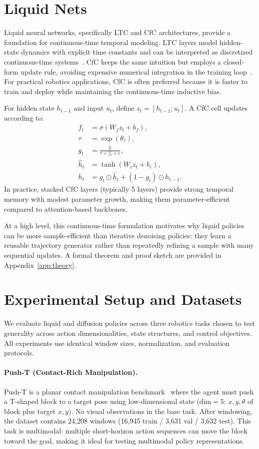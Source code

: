 \documentclass{article}
\begin{document}
\section{Liquid Nets}
Liquid neural networks, specifically LTC and CfC architectures, provide a foundation for continuous-time temporal modeling. LTC layers model hidden-state dynamics with explicit time constants and can be interpreted as discretized continuous-time systems~\cite{hasani2021ltc}. CfC keeps the same intuition but employs a closed-form update rule, avoiding expensive numerical integration in the training loop~\cite{hasani2022cfc}. For practical robotics applications, CfC is often preferred because it is faster to train and deploy while maintaining the continuous-time inductive bias.

For hidden state $h_{t-1}$ and input $u_t$, define $z_t=[h_{t-1};u_t]$. A CfC cell updates according to:
\begin{align}
f_t &= \sigma(W_f z_t+b_f), \\
\tau &= \exp(\theta_\tau), \\
g_t &= \frac{f_t}{\tau+f_t+\epsilon}, \\
\hat{h}_t &= \tanh(W_c z_t+b_c), \\
h_t &= g_t\odot\hat{h}_t + (1-g_t)\odot h_{t-1}.
\end{align}
In practice, stacked CfC layers (typically 5 layers) provide strong temporal memory with modest parameter growth, making them parameter-efficient compared to attention-based backbones.

At a high level, this continuous-time formulation motivates why liquid policies can be more sample-efficient than iterative denoising policies: they learn a reusable trajectory generator rather than repeatedly refining a sample with many sequential updates. A formal theorem and proof sketch are provided in Appendix~\ref{app:theory}.

\section{Experimental Setup and Datasets}
We evaluate liquid and diffusion policies across three robotics tasks chosen to test generality across action dimensionalities, state structures, and control objectives. All experiments use identical window sizes, normalization, and evaluation protocols.

\paragraph{Push-T (Contact-Rich Manipulation).}
Push-T is a planar contact manipulation benchmark~\cite{chi2023diffusion} where the agent must push a T-shaped block to a target pose using low-dimensional state ($\text{dim}=5$: $x, y, \theta$ of block plus target $x, y$). No visual observations in the base task. After windowing, the dataset contains 24,208 windows (16,945 train / 3,631 val / 3,632 test). This task is multimodal: multiple short-horizon action sequences can move the block toward the goal, making it ideal for testing multimodal policy representations.
\end{document}
